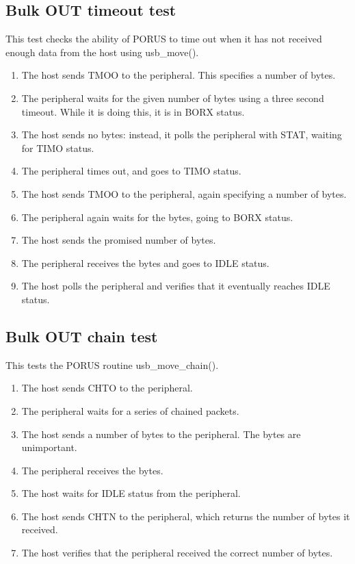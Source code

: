 \documentclass[a4paper]{book}
\begin{document}
\subsection{Bulk OUT timeout test}
\label{sec_bulkouterrortest}

This test checks the ability of PORUS to time out when it has not received enough data from the host using usb\_move().

\begin{enumerate}
\item The host sends TMOO to the peripheral.  This specifies a number of bytes.
\item The peripheral waits for the given number of bytes using a three second timeout.  While it is doing this, it is in BORX status.
\item The host sends no bytes: instead, it polls the peripheral with STAT, waiting for TIMO status.
\item The peripheral times out, and goes to TIMO status.
\item The host sends TMOO to the peripheral, again specifying a number of bytes.
\item The peripheral again waits for the bytes, going to BORX status.
\item The host sends the promised number of bytes.
\item The peripheral receives the bytes and goes to IDLE status.
\item The host polls the peripheral and verifies that it eventually reaches IDLE status.
\end{enumerate}

\subsection{Bulk OUT chain test}

This tests the PORUS routine usb\_move\_chain().

\begin{enumerate}
\item The host sends CHTO to the peripheral.
\item The peripheral waits for a series of chained packets.
\item The host sends a number of bytes to the peripheral.  The bytes are unimportant.
\item The peripheral receives the bytes.
\item The host waits for IDLE status from the peripheral.
\item The host sends CHTN to the peripheral, which returns the number of bytes it received.
\item The host verifies that the peripheral received the correct number of bytes.
\end{enumerate}
\end{document}

